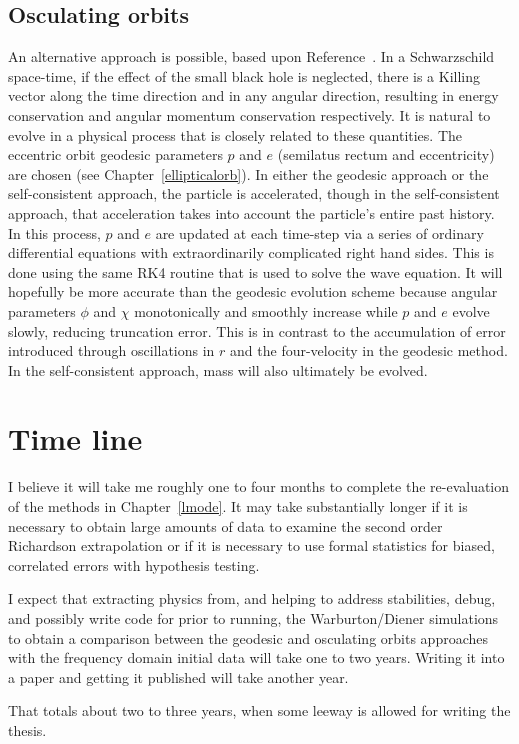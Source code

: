\subsection{Osculating orbits}

An alternative approach is possible, based upon Reference~\cite{pound_poisson}. In a Schwarzschild space-time, if the effect of the small black hole is neglected, there is a Killing vector along the time direction and in any angular direction, resulting in energy conservation and angular momentum conservation respectively. It is natural to evolve in a physical process that is closely related to these quantities. The eccentric orbit geodesic parameters $p$ and $e$ (semilatus rectum and eccentricity) are chosen (see Chapter~\ref{ellipticalorb}). In either the geodesic approach or the self-consistent approach, the particle is accelerated, though in the self-consistent approach, that acceleration takes into account the particle's entire past history. In this process, $p$ and $e$ are updated at each time-step via a series of ordinary differential equations with extraordinarily complicated right hand sides. This is done using the same RK4 routine that is used to solve the wave equation. It will hopefully be more accurate than the geodesic evolution scheme because angular parameters $\phi$ and $\chi$ monotonically and smoothly increase while $p$ and $e$ evolve slowly, reducing truncation error. This is in contrast to the accumulation of error introduced through oscillations in $r$ and the four-velocity in the geodesic method. In the self-consistent approach, mass will also ultimately be evolved.



\section{Time line}

I believe it will take me roughly one to four months to complete the re-evaluation of the methods in Chapter~\ref{lmode}. It may take substantially longer if it is necessary to obtain large amounts of data to examine the second order Richardson extrapolation or if it is necessary to use formal statistics for biased, correlated errors with hypothesis testing.

I expect that extracting physics from, and helping to address stabilities, debug, and possibly write code for prior to running, the Warburton/Diener simulations to obtain a comparison between the geodesic and osculating orbits approaches with the frequency domain initial data will take one to two years. Writing it into a paper and getting it published will take another year.

That totals about two to three years, when some leeway is allowed for writing the thesis. 



